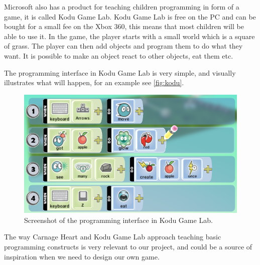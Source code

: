 Microsoft also has a product for teaching children programming in form of a game, it is called Kodu Game Lab. \cite{kodu} Kodu Game Lab is free on the PC and can be bought for a small fee on the Xbox 360, this means that most children will be able to use it. In the game, the player starts with a small world which is a square of grass. The player can then add objects and program them to do what they want. It is possible to make an object react to other objects, eat them etc.

The programming interface in Kodu Game Lab is very simple, and visually illustrates what will happen, for an example see \autoref{fig:kodu}. 

\begin{figure}[hptb]
  \centering
    \includegraphics[width=\textwidth]{img/kodu.png}
  \caption{Screenshot of the programming interface in Kodu Game Lab.}
  \label{fig:kodu}
\end{figure}

The way Carnage Heart and Kodu Game Lab approach teaching basic programming constructs is very relevant to our project, and could be a source of inspiration when we need to design our own game.
